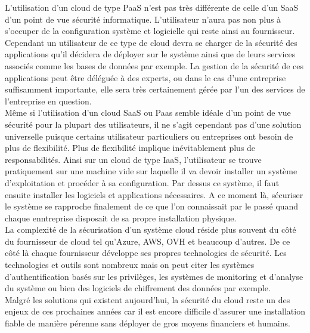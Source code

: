 \documentclass[a4paper, 12pt]{article}
\begin{document}
\begin{spacing}{1.1}
      L'utilisation d'un cloud de type PaaS n'est pas très différente de
      celle d'un SaaS d'un point de vue sécurité informatique. L'utilisateur
      n'aura pas non plus à s'occuper de la configuration système et logicielle
      qui reste ainsi au fournisseur. Cependant un utilisateur de ce type de
      cloud devra se charger de la sécurité des applications qu'il décidera de
      déployer sur le système ainsi que de leurs services associés comme les
      bases de données par exemple. La gestion de la sécurité de ces
      applications peut être déléguée à des experts, ou dans le cas d'une
      entreprise suffisamment importante, elle sera très certainement gérée
      par l'un des services de l'entreprise en question. \\

      Même si l'utilisation d'un cloud SaaS ou Paas semble idéale d'un point
      de vue sécurité pour la plupart des utilisateurs, il ne s'agit cependant
      pas d'une solution universelle puisque certains utilisateur particuliers
      ou entreprises ont besoin de plus de flexibilité. Plus de flexibilité
      implique inévitablement plus de responsabilités. Ainsi sur un cloud de
      type IaaS, l'utilisateur se trouve pratiquement sur une machine vide sur
      laquelle il va devoir installer un système d'exploitation et procéder à
      sa configuration. Par dessus ce système, il faut ensuite installer les
      logiciels et applications nécessaires. A ce moment là, sécuriser le
      système se rapproche finalement de ce que l'on connaissait par le passé
      quand chaque enntreprise disposait de sa propre installation physique. \\

      La complexité de la sécurisation d'un système cloud réside plus souvent
      du côté du fournisseur de cloud tel qu'Azure, AWS, OVH et beaucoup
      d'autres. De ce côté là chaque fournisseur développe ses propres
      technologies de sécurité. Les technologies et outils sont nombreux mais
      on peut citer les systèmes d'authentification basés sur les privilèges,
      les systèmes de monitoring et d'analyse du système ou bien des logiciels
      de chiffrement des données par exemple. \\

      Malgré les solutions qui existent aujourd'hui, la sécurité du cloud
      reste un des enjeux de ces prochaines années car il est encore difficile
      d'assurer une installation fiable de manière pérenne sans déployer de
      gros moyens financiers et humains.


\end{spacing}
\end{document}
